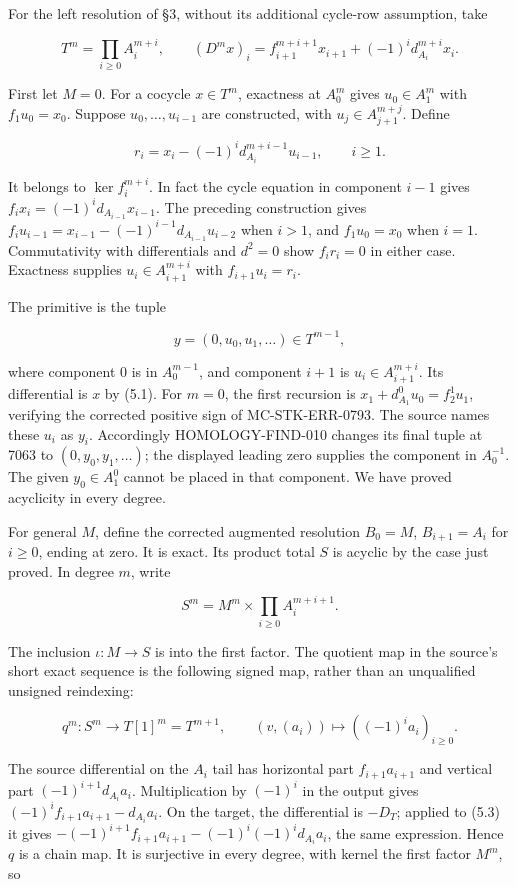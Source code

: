 \documentclass[11pt]{article}
\begin{document}
For the left resolution of §3, without its additional cycle-row assumption, take

\[
T^m=\prod_{i\geq0}A_i^{m+i},\qquad
(D^mx)_i=f_{i+1}^{m+i+1}x_{i+1}+(-1)^i d_{A_i}^{m+i}x_i.       \tag{5.1}
\]

First let \(M=0\). For a cocycle \(x\in T^m\), exactness at \(A_0^m\) gives \(u_0\in A_1^m\) with \(f_1u_0=x_0\). Suppose \(u_0,\ldots,u_{i-1}\) are constructed, with \(u_j\in A_{j+1}^{m+j}\). Define

\[
r_i=x_i-(-1)^i d_{A_i}^{m+i-1}u_{i-1},\qquad i\geq1.
\]

It belongs to \(\ker f_i^{m+i}\). In fact the cycle equation in component \(i-1\) gives \(f_ix_i=(-1)^i d_{A_{i-1}}x_{i-1}\). The preceding construction gives \(f_iu_{i-1}=x_{i-1}-(-1)^{i-1}d_{A_{i-1}}u_{i-2}\) when \(i>1\), and \(f_1u_0=x_0\) when \(i=1\). Commutativity with differentials and \(d^2=0\) show \(f_ir_i=0\) in either case. Exactness supplies \(u_i\in A_{i+1}^{m+i}\) with \(f_{i+1}u_i=r_i\).

The primitive is the tuple

\[
y=(0,u_0,u_1,\ldots)\in T^{m-1},             \tag{5.2}
\]

where component 0 is in \(A_0^{m-1}\), and component \(i+1\) is \(u_i\in A_{i+1}^{m+i}\). Its differential is \(x\) by (5.1). For \(m=0\), the first recursion is \(x_1+d_{A_1}^0u_0=f_2^1u_1\), verifying the corrected positive sign of MC-STK-ERR-0793. The source names these \(u_i\) as \(y_i\). Accordingly HOMOLOGY-FIND-010 changes its final tuple at 7063 to \((0,y_0,y_1,\ldots)\); the displayed leading zero supplies the component in \(A_0^{-1}\). The given \(y_0\in A_1^0\) cannot be placed in that component. We have proved acyclicity in every degree.

For general \(M\), define the corrected augmented resolution \(B_0=M\), \(B_{i+1}=A_i\) for \(i\geq0\), ending at zero. It is exact. Its product total \(S\) is acyclic by the case just proved. In degree \(m\), write

\[
S^m=M^m\times\prod_{i\geq0}A_i^{m+i+1}.
\]

The inclusion \(\iota:M\to S\) is into the first factor. The quotient map in the source's short exact sequence is the following signed map, rather than an unqualified unsigned reindexing:

\[
q^m:S^m\longrightarrow T[1]^m=T^{m+1},\qquad
(v,(a_i))\longmapsto((-1)^ia_i)_{i\geq0}.       \tag{5.3}
\]

The source differential on the \(A_i\) tail has horizontal part \(f_{i+1}a_{i+1}\) and vertical part \((-1)^{i+1}d_{A_i}a_i\). Multiplication by \((-1)^i\) in the output gives \((-1)^if_{i+1}a_{i+1}-d_{A_i}a_i\). On the target, the differential is \(-D_T\); applied to (5.3) it gives \(-(-1)^{i+1}f_{i+1}a_{i+1}-(-1)^i(-1)^id_{A_i}a_i\), the same expression. Hence \(q\) is a chain map. It is surjective in every degree, with kernel the first factor \(M^m\), so
\end{document}
